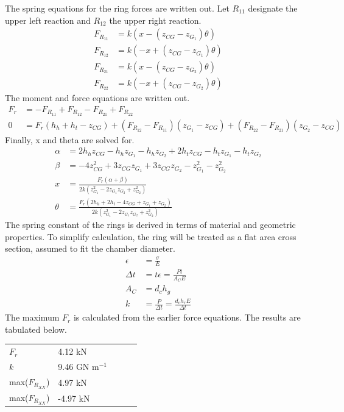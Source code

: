 \documentclass[10pt,a4paper]{article}
\begin{document}
	The spring equations for the ring forces are written out. Let $R_{11}$ designate the upper left reaction and $R_{12}$ the upper right reaction.
	\begin{align*}
		F_{R_{11}} &= k(x - (z_{CG}-z_{G_1}) \theta) \\
		F_{R_{12}} &= k(-x + (z_{CG}-z_{G_1}) \theta) \\
		F_{R_{21}} &= k(x - (z_{CG}-z_{G_2}) \theta) \\
		F_{R_{22}} &= k(-x + (z_{CG}-z_{G_2}) \theta) 
	\end{align*}
	The moment and force equations are written out.
	\begin{align*}
		F_r &= - F_{R_{11}} + F_{R_{12}} - F_{R_{21}} + F_{R_{22}}\\
		0 &= F_r (h_h + h_t - z_{CG}) + (F_{R_{12}} - F_{R_{11}})(z_{G_1} - z_{CG})+ (F_{R_{22}} - F_{R_{21}})(z_{G_2} - z_{CG})
	\end{align*}
	Finally, x and theta are solved for.
	\begin{align*}
	\alpha &= 2 h_{h} z_{CG} - h_{h} z_{G_1} - h_{h} z_{G_2} + 2 h_{t} z_{CG} - h_{t} z_{G_1} - h_{t} z_{G_2}\\
	\beta &= - 4 z_{CG}^{2} + 3 z_{CG} z_{G_1} + 3 z_{CG} z_{G_2} - z_{G_1}^{2} - z_{G_2}^{2}\\
		x &= \frac{F_{r} \left(\alpha +\beta\right)}{2 k \left(z_{G_1}^{2} - 2 z_{G_1} z_{G_2} + z_{G_2}^{2}\right)}\\
		\theta &= \frac{F_{r} \left(2 h_{h} + 2 h_{t} - 4 z_{CG} + z_{G_1} + z_{G_2}\right)}{2 k \left(z_{G_1}^{2} - 2 z_{G_1} z_{G_2} + z_{G_2}^{2}\right)}
	\end{align*}
	The spring constant of the rings is derived in terms of material and geometric properties. To simplify calculation, the ring will be treated as a flat area cross section, assumed to fit the chamber diameter.
	\begin{align*}
		\epsilon &= \frac{\sigma}{E}\\
		\Delta t &= t \epsilon = \frac{Pt}{A_C E} \\
		A_C &= d_{c} h_g \\
		k &= \frac{P}{\Delta t} = \frac{d_{c} h_r E}{\Delta t}
	\end{align*}
	The maximum $F_r$ is calculated from the earlier force equations. The results are tabulated below.
\begin{table}[H]
\begin{tabular}{lllll}
 $F_r$ & 4.12 kN \\
 $k$& 9.46 GN $\text{m}^{-1}$  \\
 max($F_{R_{XX}}$)&  4.97 kN \\
 max($F_{R_{XX}}$)&  -4.97 kN
\end{tabular}
\end{table}
\end{document}

